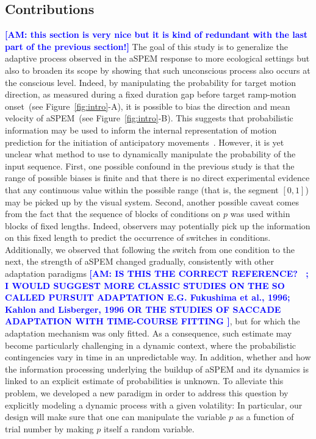 \documentclass[12pt,english]{article}%
\newcommand{\citep}[1]{\parencite{#1}}
\newcommand{\seeFig}[1]{Figure~\ref{fig:#1}}
\newcommand{\AM}[1]{\textbf{\textcolor{blue}{[AM: #1]}}}
\begin{document}
\subsection{Contributions}%
\AM{this section is very nice but it is kind of redundant with the last part of the previous section!}
The goal of this study is to generalize the adaptive process
observed in the aSPEM response to more ecological settings but
also to broaden its scope by showing that such unconscious process
also occurs at the conscious level. 
Indeed, by manipulating the probability for target motion direction,
as measured during a fixed duration gap
before target ramp-motion onset~(see \seeFig{intro}-A),
it is possible to bias the direction and mean velocity of aSPEM~(see \seeFig{intro}-B).
This suggests that probabilistic information may be used
to inform the internal representation of motion prediction
for the initiation of anticipatory movements~\citep{Montagnini2010}.
However, it is yet unclear what method to use
to dynamically manipulate the probability of the input sequence. 
First, one possible confound in the previous study
is that the range of possible biases is finite and
that there is no direct experimental evidence that
any continuous value within the possible range (that is, the segment $[ 0, 1 ]$)
may be picked up by the visual system.
Second, another possible caveat comes from the fact that the sequence of blocks of conditions on $p$
was used within blocks of fixed lengths.
Indeed, observers may potentially pick up
the information on this fixed length
to predict the occurrence of switches in conditions.
Additionally, we observed that following the switch from
one condition to the next,
the strength of aSPEM changed gradually,
consistently with other adaptation paradigms \AM{IS THIS THE CORRECT REFERENCE? ~\citep{Souto13}; I WOULD SUGGEST MORE CLASSIC 
STUDIES ON THE SO CALLED PURSUIT ADAPTATION E.G. Fukushima et al., 1996; Kahlon and Lisberger, 1996 OR THE STUDIES OF SACCADE ADAPTATION WITH TIME-COURSE FITTING },
but for which the adaptation mechanism was only fitted.
As a consequence, such estimate may become particularly
challenging in a dynamic context,
where the probabilistic contingencies vary in time in an unpredictable way.
In addition, whether and how the information processing underlying
the buildup of aSPEM and its dynamics is linked to
an explicit estimate of probabilities is unknown.
To alleviate this problem, we developed a new paradigm
in order to address this question
by explicitly modeling a dynamic process with a given volatility:
In particular, our design will make sure that one can manipulate the variable $p$ 
as a function of trial number by making $p$ itself a random variable. %
\end{document}
